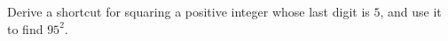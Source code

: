 Derive a shortcut for squaring a positive integer whose last digit is $5$, and use it to find $95^2$.
